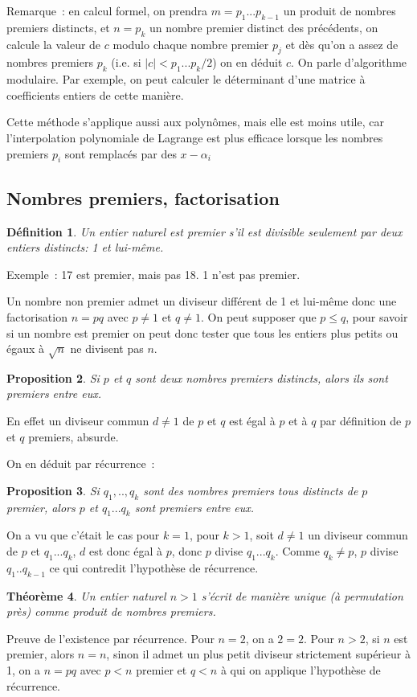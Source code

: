 \documentclass[a4paper,11pt]{book}
\newtheorem{thm}{Théorème}
\newtheorem{defn}[thm]{D\'efinition}
\newtheorem{prop}[thm]{Proposition}
\begin{document}
\begin{giacjshere}
Remarque~: en calcul formel, on prendra $m=p_1...p_{k-1}$ un produit de
nombres premiers distincts, et $n=p_{k}$ un nombre premier distinct
des pr\'ec\'edents, on calcule la valeur de $c$ modulo chaque nombre
premier $p_j$ et d\`es qu'on a assez de nombres premiers $p_k$
(i.e. si $|c|<p_1...p_k/2$) on en d\'eduit $c$.
On parle d'algorithme modulaire.
Par exemple, on peut calculer le d\'eterminant d'une matrice \`a
coefficients entiers de cette mani\`ere.

Cette m\'ethode s'applique aussi aux polyn\^omes, mais elle
est moins utile, car
l'interpolation polynomiale de Lagrange est plus efficace
lorsque les nombres premiers $p_i$ sont remplac\'es par des $x-\alpha_i$

\subsection{Nombres premiers, factorisation}
\begin{defn}
Un entier naturel est premier s'il est divisible seulement par deux
entiers distincts: 1 et lui-m\^eme.
\end{defn}
Exemple~: 17 est premier, mais pas 18. 1 n'est pas premier.

Un nombre non premier admet un diviseur diff\'erent de 1 et lui-m\^eme
donc une factorisation $n=pq$ avec $p \neq 1$ et $q \neq 1$. On peut
supposer que $p \leq q$, pour savoir si un nombre est premier
on peut donc tester que tous les entiers plus petits ou \'egaux \`a $\sqrt{n}$
ne divisent pas $n$.

\begin{prop}
Si $p$ et $q$ sont deux nombres premiers distincts, alors ils sont
premiers entre eux. 
\end{prop}
En effet un diviseur commun $d \neq 1$ de $p$ et
$q$ est \'egal \`a $p$ et \`a $q$ par d\'efinition de $p$ et $q$
premiers, absurde.

On en d\'eduit par r\'ecurrence~:
\begin{prop}
Si $q_1,..,q_k$ sont des nombres premiers tous distincts de $p$
premier, alors $p$ et $q_1...q_k$ sont premiers entre eux.
\end{prop}
On a vu que c'\'etait le cas pour $k=1$, pour $k>1$, soit $d \neq 1$ un
diviseur commun de $p$ et $q_1...q_k$, $d$ est donc \'egal \`a $p$,
donc $p$ divise $q_1...q_k$. Comme $q_k \neq p$, $p$ divise
$q_1..q_{k-1}$ ce qui contredit l'hypoth\`ese de r\'ecurrence.

\begin{thm}
Un entier naturel $n>1$ s'\'ecrit de mani\`ere unique (\`a permutation pr\`es)
comme produit de nombres premiers. 
\end{thm}
Preuve de l'existence par r\'ecurrence.
Pour $n=2$, on a $2=2$.
Pour $n>2$, si $n$ est premier, alors $n=n$, sinon il admet un
plus petit diviseur strictement sup\'erieur \`a 1, on a $n=pq$ avec $p<n$
premier et $q<n$ \`a qui on applique
l'hypoth\`ese de r\'ecurrence.


\end{giacjshere}
\end{document}
